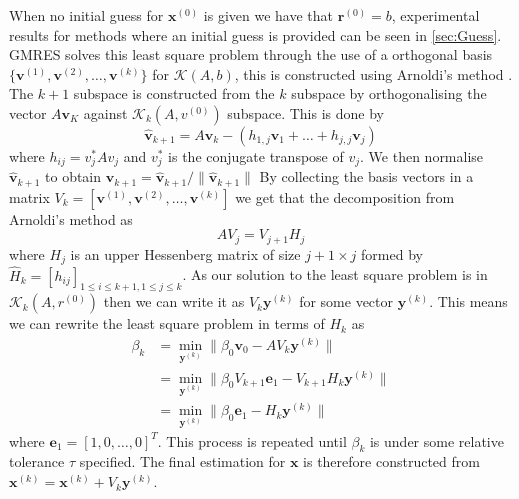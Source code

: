 When no initial guess for $\bm{x}^{(0)}$ is given we have that $\bm{r}^{(0)}=b$, experimental results for methods where an initial guess is provided can be seen in \cref{sec:Guess}. GMRES solves this least square problem through the use of a orthogonal basis $\{\bm{v}^{(1)},\bm{v}^{(2)},\dots,\bm{v}^{(k)}\}$ for $\mathcal{K}(A,b)$, this is constructed using Arnoldi's method \cite{Arnoldi1951TheProblem,Elman2005FiniteDynamics}. The $k+1$ subspace is constructed from the $k$ subspace by orthogonalising the vector $A\bm{v}_K$ against $\mathcal{K}_k(A,v^{(0)})$ subspace. This is done by
\begin{equation*}
    \bm{\hat{v}}_{k+1} = A\bm{v}_k - (h_{1,j}\bm{v}_1 + \dots + h_{j,j}\bm{v}_j)
\end{equation*}
where $h_{ij} = v_j^*Av_j$ and $v_j^*$ is the conjugate transpose of $v_j$. We then normalise $\bm{\hat{v}}_{k+1}$ to obtain $\bm{v}_{k+1}=\bm{\hat{v}}_{k+1}/\lVert \bm{\hat{v}}_{k+1} \rVert$
By collecting the basis vectors in a matrix $V_k = [\bm{v}^{(1)},\bm{v}^{(2)},\dots,\bm{v}^{(k)}]$ we get that the decomposition from Arnoldi's method as
\begin{equation*}
    AV_j = V_{j+1} H_j
\end{equation*}
 where $H_j$ is an upper Hessenberg matrix of size $j + 1\times j$ formed by $\hat{H}_k = [h_{ij}]_{1 \leq i \leq k+1, 1 \leq j \leq k}$. As our solution to the least square problem is in $\mathcal{K}_k(A,r^{(0)})$ then we can write it as $V_k\bm{y}^{(k)}$ for some vector $\bm{y}^{(k)}$. This means we can rewrite the least square problem in terms of $H_k$ as
 \begin{equation*}
 \begin{aligned}
          \beta_k &= \min\limits_{\bm{y}^{(k)}} \lVert  \beta_0 \bm{v}_0 - AV_k\bm{y}^{(k)} \rVert \\
          &= \min\limits_{\bm{y}^{(k)}} \lVert \beta_0 V_{k+1} \bm{e}_1 - V_{k+1}H_k\bm{y}^{(k)} \rVert \\
          &= \min\limits_{\bm{y}^{(k)}} \lVert \beta_0 \bm{e}_1 - H_k\bm{y}^{(k)} \rVert
 \end{aligned}
 \end{equation*}
where $\bm{e}_1 = [1,0,\dots,0]^T$. This process is repeated until $\beta_k$ is under some relative tolerance $\tau$ specified. The final estimation for $\bm{x}$ is therefore constructed from $\bm{x}^{(k)} = \bm{x}^{(k)} + V_k\bm{y}^{(k)}$.

